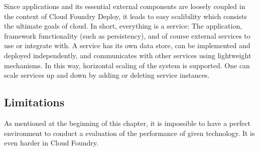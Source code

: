 Since applications and its essential external components are loosely coupled in the context of Cloud Foundry Deploy, it leads to easy scalibility which consists the ultimate goals of cloud.  In short, everything is a service: The application, framework functionality (such as persistency), and of course external services to use or integrate with. A service has its own data store, can be implemented and deployed independently, and communicates with other services using lightweight mechanisms.  In this way, horizontal scaling of the system is supported. One can scale services up and down by adding or deleting service instances.

\subsection{Limitations}
As mentioned at the beginning of this chapter, it is impossible to have a perfect environment to conduct a evaluation of the performance of given technology. It is even harder in Cloud Foundry. \\
